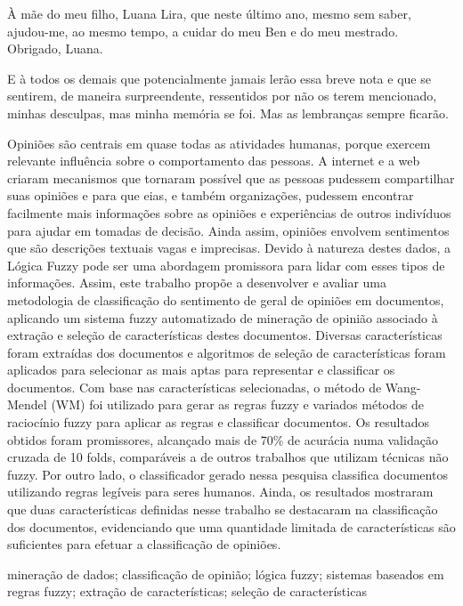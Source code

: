 \documentclass[msc, a4paper, classic, pt]{ufbathesis}
\begin{document}
À mãe do meu filho, Luana Lira, que neste último ano, mesmo sem saber, ajudou-me, ao mesmo tempo, a cuidar do meu Ben e do meu mestrado. Obrigado, Luana.

E à todos os demais que potencialmente jamais lerão essa breve nota e que se sentirem, de maneira surpreendente, ressentidos por não os terem mencionado, minhas desculpas, mas minha memória se foi. Mas as lembranças sempre ficarão.

\resumo
Opiniões são centrais em quase todas as atividades humanas, porque exercem relevante influência sobre o comportamento das pessoas. A internet e a web criaram mecanismos que tornaram possível que as pessoas pudessem compartilhar suas opiniões e para que eias, e também organizações, pudessem encontrar facilmente mais informações sobre as opiniões e experiências de outros indivíduos para ajudar em tomadas de decisão. Ainda assim, opiniões envolvem sentimentos que são descrições textuais vagas e imprecisas. Devido à natureza destes dados, a Lógica Fuzzy pode ser uma abordagem promissora para lidar com esses tipos de informações. Assim, este trabalho propõe a desenvolver e avaliar uma metodologia de classificação do sentimento de geral de opiniões em documentos, aplicando um sistema fuzzy automatizado de mineração de opinião associado à extração e seleção de características destes documentos. Diversas características foram extraídas dos documentos e algoritmos de seleção de características foram aplicados para selecionar as mais aptas para representar e classificar os documentos. Com base nas características selecionadas, o método de Wang-Mendel (WM) foi utilizado para gerar as regras fuzzy e variados métodos de raciocínio fuzzy para aplicar as regras e classificar documentos. 
Os resultados obtidos foram promissores, alcançado mais de 70\% de acurácia numa validação cruzada de 10 folds, comparáveis a de outros trabalhos que utilizam técnicas não fuzzy. Por outro lado, o classificador gerado nessa pesquisa classifica documentos utilizando regras legíveis para seres humanos. Ainda, os resultados mostraram que duas características definidas nesse trabalho se destacaram na classificação dos documentos, evidenciando que uma quantidade limitada de características são suficientes para efetuar a classificação de opiniões.
\begin{keywords}
mineração de dados; classificação de opinião; lógica fuzzy; sistemas baseados em regras fuzzy; extração de características; seleção de características
\end{keywords}
\end{document}
